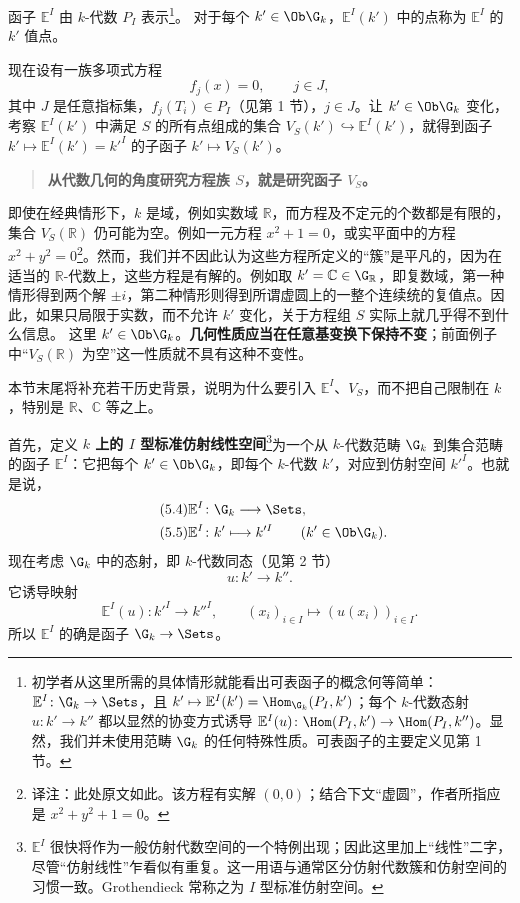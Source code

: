 函子 $\mathbb E^I$ 由 $k$-代数 $P_I$ 表示\footnote{初学者从这里所需的具体情形就能看出可表函子的概念何等简单：$\mathbb E^I\colon\G_k\to\Sets$，且 $k'\mapsto\mathbb E^I(k')=\Hom_{\G_k}(P_I,k')$；每个 $k$-代数态射 $u\colon k'\to k''$ 都以显然的协变方式诱导 $\mathbb E^I(u)\colon\Hom(P_I,k')\to\Hom(P_I,k'')$。显然，我们并未使用范畴 $\G_k$ 的任何特殊性质。可表函子的主要定义见第 1 节。}。
对于每个 $k'\in\Ob\G_k$，$\mathbb E^I(k')$ 中的点称为 $\mathbb E^I$ 的 $k'$ 值点。

现在设有一族多项式方程
\begin{equation}\tag{5.3} f_j(x)=0,\qquad j\in J,\end{equation}
其中 $J$ 是任意指标集，$f_j(T_i)\in P_I$（见第 1 节），$j\in J$。让 $k'\in\Ob\G_k$ 变化，考察 $\mathbb E^I(k')$ 中满足 $S$ 的所有点组成的集合 $V_S(k')\hookrightarrow\mathbb E^I(k')$，就得到函子 $k'\mapsto\mathbb E^I(k')=k'^I$ 的子函子 $k'\mapsto V_S(k')$。

\begin{quote}\bfseries 从代数几何的角度研究方程族 $S$，就是研究函子 $V_S$。\end{quote}

即使在经典情形下，$k$ 是域，例如实数域 $\mathbb R$，而方程及不定元的个数都是有限的，集合 $V_S(\mathbb R)$ 仍可能为空。例如一元方程 $x^2+1=0$，或实平面中的方程 $x^2+y^2=0$\footnote{译注：此处原文如此。该方程有实解 $(0,0)$；结合下文“虚圆”，作者所指应是 $x^2+y^2+1=0$。}。然而，我们并不因此认为这些方程所定义的“簇”是平凡的，因为在适当的 $\mathbb R$-代数上，这些方程是有解的。例如取 $k'=\mathbb C\in\G_{\mathbb R}$，即复数域，第一种情形得到两个解 $\pm i$，第二种情形则得到所谓虚圆上的一整个连续统的复值点。因此，如果只局限于实数，而不允许 $k'$ 变化，关于方程组 $S$ 实际上就几乎得不到什么信息。
这里 $k'\in\Ob\G_k$。\textbf{几何性质应当在任意基变换下保持不变}；前面例子中“$V_S(\mathbb R)$ 为空”这一性质就不具有这种不变性。

本节末尾将补充若干历史背景，说明为什么要引入 $\mathbb E^I$、$V_S$，而不把自己限制在 $k$，特别是 $\mathbb R$、$\mathbb C$ 等之上。

首先，定义 \textbf{$k$ 上的 $I$ 型标准仿射线性空间}\footnote{$\mathbb E^I$ 很快将作为一般仿射代数空间的一个特例出现；因此这里加上“线性”二字，尽管“仿射线性”乍看似有重复。这一用语与通常区分仿射代数簇和仿射空间的习惯一致。Grothendieck 常称之为 $I$ 型标准仿射空间。}为一个从 $k$-代数范畴 $\G_k$ 到集合范畴的函子 $\mathbb E^I$：它把每个 $k'\in\Ob\G_k$，即每个 $k$-代数 $k'$，对应到仿射空间 $k'^I$。也就是说，
\begin{align}\tag{5.4}\mathbb E^I&\colon\G_k\longrightarrow\Sets,\\\tag{5.5}\mathbb E^I&\colon k'\longmapsto k'^I\qquad(k'\in\Ob\G_k).
\end{align}
现在考虑 $\G_k$ 中的态射，即 $k$-代数同态（见第 2 节）
\begin{equation}\tag{5.6}u\colon k'\longrightarrow k''.
\end{equation}
它诱导映射
\begin{equation}\tag{5.7}\mathbb E^I(u)\colon k'^I\longrightarrow k''^I,\qquad(x_i)_{i\in I}\longmapsto(u(x_i))_{i\in I}.
\end{equation}
所以 $\mathbb E^I$ 的确是函子 $\G_k\to\Sets$。

